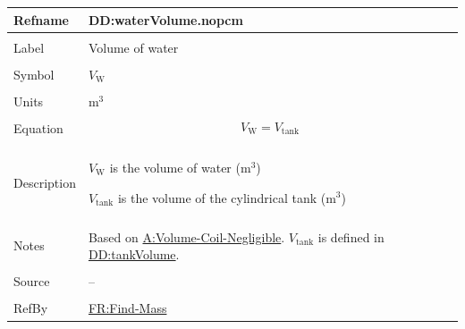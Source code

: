 \documentclass[12pt]{article}
\begin{document}
\vspace{\baselineskip}
\noindent
\begin{minipage}{\textwidth}
\begin{tabular}{>{\raggedright}p{}>{\raggedright\arraybackslash}p{}}
\toprule \textbf{Refname} & \textbf{DD:waterVolume.nopcm}
\label{DD:waterVolume.nopcm}
\\ \midrule \\
Label & Volume of water
        
\\ \midrule \\
Symbol & ${V_{\text{W}}}$
         
\\ \midrule \\
Units & ${\text{m}^{3}}$
        
\\ \midrule \\
Equation & \begin{displaymath}
           {V_{\text{W}}}={V_{\text{tank}}}
           \end{displaymath}
\\ \midrule \\
Description & \begin{symbDescription}
              \item{${V_{\text{W}}}$ is the volume of water (${\text{m}^{3}}$)}
              \item{${V_{\text{tank}}}$ is the volume of the cylindrical tank (${\text{m}^{3}}$)}
              \end{symbDescription}
\\ \midrule \\
Notes & Based on \hyperref[assumpVCN]{A:Volume-Coil-Negligible}. ${V_{\text{tank}}}$ is defined in \hyperref[DD:tankVolume]{DD:tankVolume}.
        
\\ \midrule \\
Source & --
         
\\ \midrule \\
RefBy & \hyperref[findMass]{FR:Find-Mass}
        
\\ \bottomrule
\end{tabular}
\end{minipage}
\end{document}

